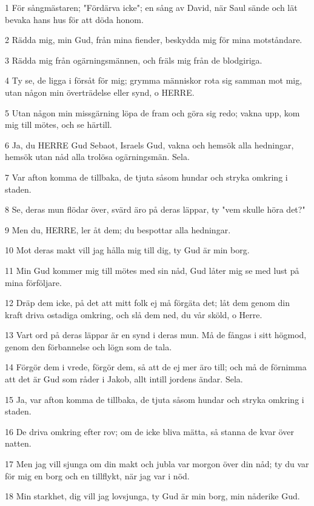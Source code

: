 \par 1 För sångmästaren; "Fördärva icke"; en sång av David, när Saul sände och lät bevaka hans hus för att döda honom.
\par 2 Rädda mig, min Gud, från mina fiender, beskydda mig för mina motståndare.
\par 3 Rädda mig från ogärningsmännen, och fräls mig från de blodgiriga.
\par 4 Ty se, de ligga i försåt för mig; grymma människor rota sig samman mot mig, utan någon min överträdelse eller synd, o HERRE.
\par 5 Utan någon min missgärning löpa de fram och göra sig redo; vakna upp, kom mig till mötes, och se härtill.
\par 6 Ja, du HERRE Gud Sebaot, Israels Gud, vakna och hemsök alla hedningar, hemsök utan nåd alla trolösa ogärningsmän. Sela.
\par 7 Var afton komma de tillbaka, de tjuta såsom hundar och stryka omkring i staden.
\par 8 Se, deras mun flödar över, svärd äro på deras läppar, ty "vem skulle höra det?"
\par 9 Men du, HERRE, ler åt dem; du bespottar alla hedningar.
\par 10 Mot deras makt vill jag hålla mig till dig, ty Gud är min borg.
\par 11 Min Gud kommer mig till mötes med sin nåd, Gud låter mig se med lust på mina förföljare.
\par 12 Dräp dem icke, på det att mitt folk ej må förgäta det; låt dem genom din kraft driva ostadiga omkring, och slå dem ned, du vår sköld, o Herre.
\par 13 Vart ord på deras läppar är en synd i deras mun. Må de fångas i sitt högmod, genom den förbannelse och lögn som de tala.
\par 14 Förgör dem i vrede, förgör dem, så att de ej mer äro till; och må de förnimma att det är Gud som råder i Jakob, allt intill jordens ändar. Sela.
\par 15 Ja, var afton komma de tillbaka, de tjuta såsom hundar och stryka omkring i staden.
\par 16 De driva omkring efter rov; om de icke bliva mätta, så stanna de kvar över natten.
\par 17 Men jag vill sjunga om din makt och jubla var morgon över din nåd; ty du var för mig en borg och en tillflykt, när jag var i nöd.
\par 18 Min starkhet, dig vill jag lovsjunga, ty Gud är min borg, min nåderike Gud.

